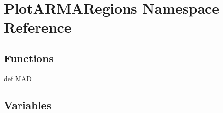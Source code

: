 \hypertarget{namespace_plot_a_r_m_a_regions}{\section{Plot\-A\-R\-M\-A\-Regions Namespace Reference}
\label{namespace_plot_a_r_m_a_regions}
}
\subsection*{Functions}
\begin{DoxyCompactItemize}
\item 
def \hyperlink{namespace_plot_a_r_m_a_regions_ab8d32e5943f6391d1de1d360f78a4e1c}{M\-A\-D}
\end{DoxyCompactItemize}
\subsection*{Variables}
